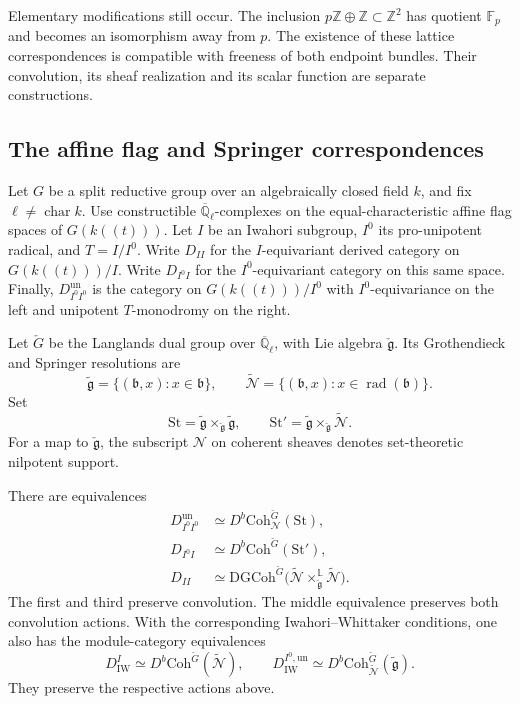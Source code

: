 Elementary modifications still occur. The inclusion
\(p\mathbb Z\oplus\mathbb Z\subset\mathbb Z^2\) has quotient
\(\mathbb F_p\) and becomes an isomorphism away from \(p\).
The existence of these lattice correspondences is compatible with
freeness of both endpoint bundles.
Their convolution, its sheaf realization and its scalar function
are separate constructions.

\subsection{The affine flag and Springer correspondences}

Let \(G\) be a split reductive group over an algebraically closed
field \(k\), and fix \(\ell\ne\operatorname{char}k\).
Use constructible \(\overline{\mathbb Q}_\ell\)-complexes on the
equal-characteristic affine flag spaces of \(G(k((t)))\).
Let \(I\) be an Iwahori subgroup, \(I^0\) its pro-unipotent radical,
and \(T=I/I^0\).
Write \(D_{II}\) for the \(I\)-equivariant derived category on
\(G(k((t)))/I\).
Write \(D_{I^0I}\) for the \(I^0\)-equivariant category on this
same space.
Finally, \(D_{I^0I^0}^{\mathrm{un}}\) is the category on
\(G(k((t)))/I^0\) with \(I^0\)-equivariance on the left and
unipotent \(T\)-monodromy on the right.

Let \(\check G\) be the Langlands dual group over
\(\overline{\mathbb Q}_\ell\), with Lie algebra \(\check{\mathfrak g}\).
Its Grothendieck and Springer resolutions are
\[
 \widetilde{\mathfrak g}
   =\{(\mathfrak b,x):x\in\mathfrak b\},
 \qquad
 \widetilde{\mathcal N}
   =\{(\mathfrak b,x):x\in\operatorname{rad}(\mathfrak b)\}.
\]
Set
\[
 \mathrm{St}=
 \widetilde{\mathfrak g}\times_{\check{\mathfrak g}}
                       \widetilde{\mathfrak g},
 \qquad
 \mathrm{St}'=
 \widetilde{\mathfrak g}\times_{\check{\mathfrak g}}
                       \widetilde{\mathcal N}.
\]
For a map to \(\check{\mathfrak g}\), the subscript
\(\mathcal N\) on coherent sheaves denotes set-theoretic
nilpotent support.

\begin{theorem}[Bezrukavnikov]\label{v4-arith:ic:affine-flag}
There are equivalences
\[
 \begin{aligned}
 D_{I^0I^0}^{\mathrm{un}}
   &\simeq D^b\mathrm{Coh}^{\check G}_{\mathcal N}(\mathrm{St}),\\
 D_{I^0I}
   &\simeq D^b\mathrm{Coh}^{\check G}(\mathrm{St}'),\\
 D_{II}
   &\simeq
 \mathrm{DGCoh}^{\check G}
 \bigl(\widetilde{\mathcal N}
       \times_{\check{\mathfrak g}}^{\mathbb L}
       \widetilde{\mathcal N}\bigr).
 \end{aligned}
\]
The first and third preserve convolution. The middle equivalence
preserves both convolution actions.
With the corresponding Iwahori--Whittaker conditions, one also has
the module-category equivalences
\[
 D^I_{\mathrm{IW}}\simeq
 D^b\mathrm{Coh}^{\check G}(\widetilde{\mathcal N}),
 \qquad
 D^{I^0,\mathrm{un}}_{\mathrm{IW}}\simeq
 D^b\mathrm{Coh}^{\check G}_{\widetilde{\mathcal N}}
                  (\widetilde{\mathfrak g}).
\]
They preserve the respective actions above.
\end{theorem}

